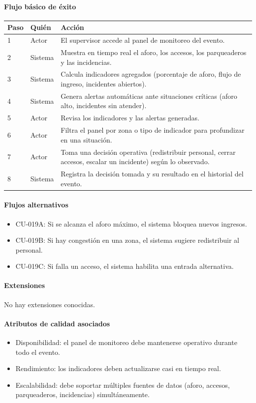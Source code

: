 \paragraph{Flujo básico de éxito}
\begin{longtable}{P{1.1cm}P{1.8cm}P{10.5cm}}
\toprule
\textbf{Paso} & \textbf{Quién} & \textbf{Acción}\\
\midrule
{} & Actor & El supervisor accede al panel de monitoreo del evento.\\
2 & Sistema & Muestra en tiempo real el aforo, los accesos, los parqueaderos y las incidencias.\\
3 & Sistema & Calcula indicadores agregados (porcentaje de aforo, flujo de ingreso, incidentes abiertos).\\
4 & Sistema & Genera alertas automáticas ante situaciones críticas (aforo alto, incidentes sin atender).\\
5 & Actor & Revisa los indicadores y las alertas generadas.\\
6 & Actor & Filtra el panel por zona o tipo de indicador para profundizar en una situación.\\
7 & Actor & Toma una decisión operativa (redistribuir personal, cerrar accesos, escalar un incidente) según lo observado.\\
8 & Sistema & Registra la decisión tomada y su resultado en el historial del evento.\\
\bottomrule
\end{longtable}

\paragraph{Flujos alternativos}
\begin{itemize}[leftmargin=1.4em, topsep=1pt]
  \item CU-019A: Si se alcanza el aforo máximo, el sistema bloquea nuevos ingresos.
  \item CU-019B: Si hay congestión en una zona, el sistema sugiere redistribuir al personal.
  \item CU-019C: Si falla un acceso, el sistema habilita una entrada alternativa.
\end{itemize}

\paragraph{Extensiones}
No hay extensiones conocidas.

\paragraph{Atributos de calidad asociados}
\begin{itemize}[leftmargin=1.4em, topsep=1pt]
  \item Disponibilidad: el panel de monitoreo debe mantenerse operativo durante todo el evento.
  \item Rendimiento: los indicadores deben actualizarse casi en tiempo real.
  \item Escalabilidad: debe soportar múltiples fuentes de datos (aforo, accesos, parqueaderos, incidencias) simultáneamente.
\end{itemize}

